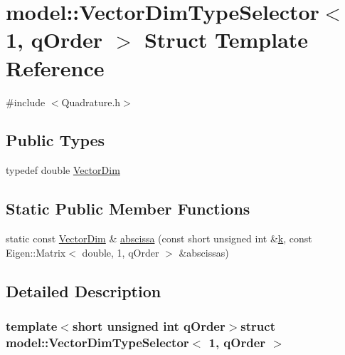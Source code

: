 \hypertarget{structmodel_1_1_vector_dim_type_selector_3_011_00_01q_order_01_4}{}\section{model\+:\+:Vector\+Dim\+Type\+Selector$<$ 1, q\+Order $>$ Struct Template Reference}
\label{structmodel_1_1_vector_dim_type_selector_3_011_00_01q_order_01_4}


{\ttfamily \#include $<$Quadrature.\+h$>$}

\subsection*{Public Types}
\begin{DoxyCompactItemize}
\item 
typedef double \hyperlink{structmodel_1_1_vector_dim_type_selector_3_011_00_01q_order_01_4_ac67f1ca2e2eba93e84a7abb50936d112}{Vector\+Dim}
\end{DoxyCompactItemize}
\subsection*{Static Public Member Functions}
\begin{DoxyCompactItemize}
\item 
static const \hyperlink{structmodel_1_1_vector_dim_type_selector_3_011_00_01q_order_01_4_ac67f1ca2e2eba93e84a7abb50936d112}{Vector\+Dim} \& \hyperlink{structmodel_1_1_vector_dim_type_selector_3_011_00_01q_order_01_4_a1cd99979c71241b8f3fe811ce1baceb9}{abscissa} (const short unsigned int \&\hyperlink{_f_e_m_2linear__elasticity__3d_2tetgen_2generate_p_o_l_ycube_8m_a5d2aad4440da75aa43f2643e72b1a3bd}{k}, const Eigen\+::\+Matrix$<$ double, 1, q\+Order $>$ \&abscissas)
\end{DoxyCompactItemize}


\subsection{Detailed Description}
\subsubsection*{template$<$short unsigned int q\+Order$>$struct model\+::\+Vector\+Dim\+Type\+Selector$<$ 1, q\+Order $>$}



